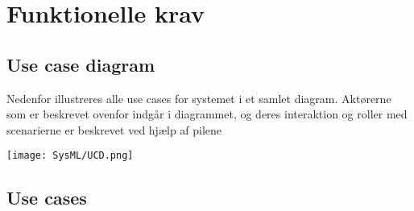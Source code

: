 \chapter{Funktionelle krav}

\section{Use case diagram}
Nedenfor illustreres alle use cases for systemet i et samlet diagram. Aktørerne som er beskrevet ovenfor indgår i diagrammet, og deres interaktion og roller med scenarierne er beskrevet ved hjælp af pilene
\begin{center}
	\texttt{[image: SysML/UCD.png]}
\end{center}



\newpage

\section{Use cases}
	
	
	
	
	
	
	
	
	
	
	
	
	
	
	

